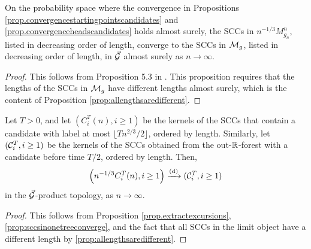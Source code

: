 \begin{proposition}
\label{prop:sccsinonetreeconverge}
On the probability space where the convergence in Propositions \ref{prop.convergencestartingpointscandidates} and \ref{prop.convergenceheadscandidates} holds almost surely, the SCCs in $n^{-1/3}M^n_{g_n}$, listed in decreasing order of length, converge to the SCCs in ${\mathcal M}_g$, listed in decreasing order of length, in $\vec{{\mathcal G}}$ almost surely as $n\to \infty$.
\end{proposition}
\begin{proof}
This follows from Proposition 5.3 in \cite{goldschmidtScalingLimitCritical2019}. This proposition requires that the lengths of the SCCs in ${\mathcal M}_{g}$ have different lengths almost surely, which is the content of Proposition \ref{prop:allengthsaredifferent}. 
\end{proof}

\begin{proposition}
\label{prop:sccordereduptotimeT}
Let $T>0$, and let $(C^T_i(n),i\geq 1)$ be the kernels of the SCCs that contain a candidate with label at most $\lfloor T n^{2/3}/2\rfloor$, ordered by length. Similarly, let $({\mathcal C}^T_i,i\geq 1)$ be the kernels of the SCCs obtained from the out-${\mathbb R}$-forest with a candidate before time $T/2$, ordered by length. Then,
$$\left(n^{-1/3}C^T_i(n), i\geq 1\right) \xrightarrow[]{\mathrm{(d)}} ({\mathcal C}^T_i,i\geq 1)$$
in the $\vec{{\mathcal G}}$-product topology, as $n\to \infty$. 
\end{proposition}
\begin{proof}
This follows from Proposition \ref{prop.extractexcursions}, \cref{prop:sccsinonetreeconverge}, and the fact that all SCCs in the limit object have a different length by \cref{prop:allengthsaredifferent}. 
\end{proof}

